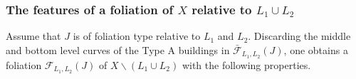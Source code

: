 \documentclass[12pt]{amsart}
\theoremstyle{definition}
\newcommand{\RR}{{\mathbb R}}
\begin{document}



 
\subsubsection{The features of a foliation of $X$ relative to $L_1 \cup L_2$}\label{features}
Assume that $J$  is of foliation type relative to $L_1$ and $L_2$. Discarding the middle and bottom  level curves of the Type A buildings in $\bar{\mathcal{F}}_{L_1,L_2}(J)$, one obtains a foliation 
$\mathcal{F}_{L_1,L_2}(J)$ of $X\smallsetminus (L_1 \cup L_2)$ with the following properties.

\bigskip
\end{document}

